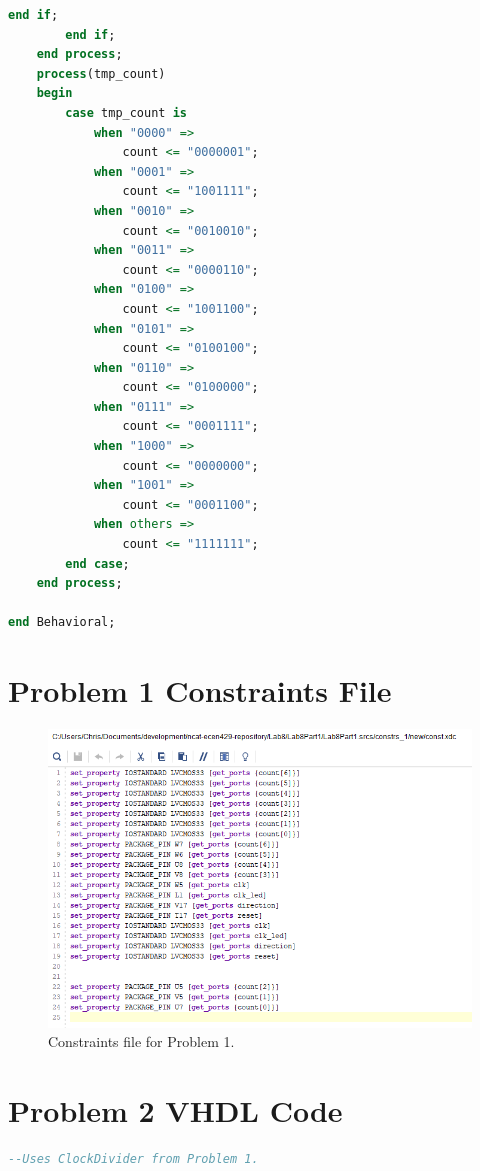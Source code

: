 \documentclass[11pt]{article}
\begin{document}
\begin{appendices}
\begin{lstlisting}[language=VHDL]
            end if;
        end if;
    end process;
    process(tmp_count)
    begin
        case tmp_count is
            when "0000" =>
                count <= "0000001";
            when "0001" =>
                count <= "1001111";
            when "0010" =>
                count <= "0010010";
            when "0011" =>
                count <= "0000110";
            when "0100" =>
                count <= "1001100";
            when "0101" =>
                count <= "0100100";
            when "0110" =>
                count <= "0100000";
            when "0111" =>
                count <= "0001111";
            when "1000" =>
                count <= "0000000";
            when "1001" =>
                count <= "0001100";
            when others =>
                count <= "1111111";
        end case;
    end process;    
    
end Behavioral;
\end{lstlisting}

\section{Problem 1 Constraints File}
\begin{center}
\begin{figure}[H]
	\includegraphics[scale=1]{./images/const1.png}
	\caption{\label{fig:Prob1Const}Constraints file for Problem 1.}
\end{figure}
\end{center}

\section{Problem 2 VHDL Code}
\begin{lstlisting}[language=VHDL]
--Uses ClockDivider from Problem 1.


\end{lstlisting}
\end{appendices}
\end{document}
